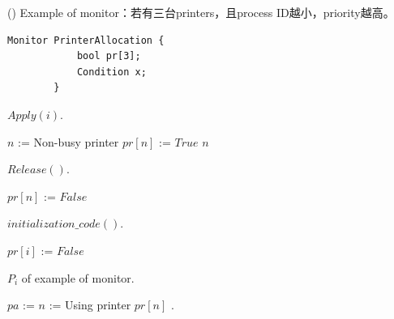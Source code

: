 \begin{theorem}{()} Example of monitor：若有三台printers，且process ID越小，priority越高。
    \begin{lstlisting}[caption={Data structure of example of monitor)}, captionpos=b, mathescape=true]
        Monitor PrinterAllocation {
            bool pr[3];
            Condition x;
        } 
    \end{lstlisting}
    \begin{algorithm}[H]
        \caption{$Apply(i)$.}
        \begin{algorithmic}[1]
                    \State {}
                \Else
                    \State $n$ := Non-busy printer
                    \State $pr[n]$ := $True$
                    \State \Return $n$
                \EndIf
            \EndFunction
        \end{algorithmic}
    \end{algorithm}
    \begin{algorithm}[H]
        \caption{$Release()$.}
        \begin{algorithmic}[1]
                \State $pr[n]$ := $False$
                \State {}
            \EndFunction
        \end{algorithmic}
    \end{algorithm}
    \begin{algorithm}[H]
        \caption{$initialization\_code()$.}
        \begin{algorithmic}[1]
                    \State $pr[i]$ := $False$
                \EndFor
            \EndFunction
        \end{algorithmic}
    \end{algorithm}
    \begin{algorithm}[H]
        \caption{$P_i$ of example of monitor.}
        \begin{algorithmic}[1]
                \State $pa$ :=   
                \State $n$ := 
                \State Using printer $pr[n]$ .
                \State {}
            \EndFunction
        \end{algorithmic}
    \end{algorithm}
\end{theorem}

